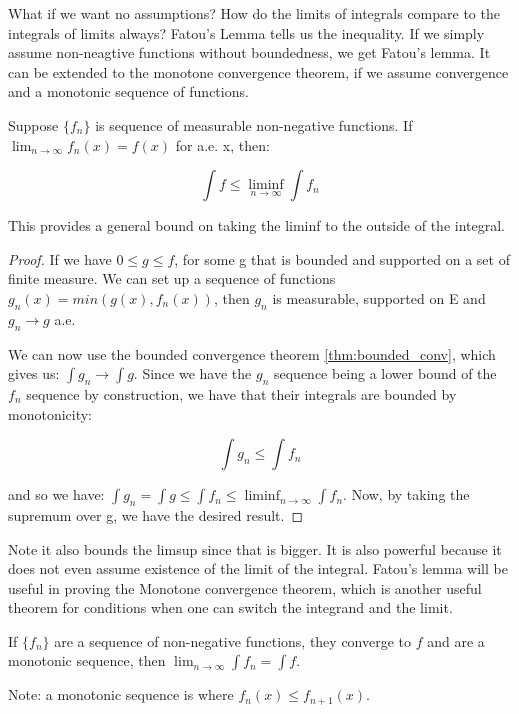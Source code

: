 \documentclass[class=article, crop=false]{standalone}
\begin{document}
		What if we want no assumptions? How do the limits of integrals compare to the integrals of limits always? Fatou's Lemma tells us the inequality. If we simply assume non-neagtive functions without boundedness, we get Fatou's lemma. It can be extended to the monotone convergence theorem, if we assume convergence and a monotonic sequence of functions.

		\begin{theorem} 
		\label{thm:fatous_lemma}
			Suppose $\{f_n\}$ is sequence of measurable non-negative functions. If $\lim_{n\rightarrow\infty} f_n(x) = f(x)$ for a.e. x, then:

				$$\int f \le \liminf_{n\rightarrow\infty} \int f_n$$

			This provides a general bound on taking the liminf to the outside of the integral. 
		\end{theorem}
		\begin{proof}
			If we have $0 \le g \le f$, for some g that is bounded and supported on a set of finite measure. We can set up a sequence of functions $g_n(x) = min(g(x), f_n(x))$, then $g_n$ is measurable, supported on E and $g_n \rightarrow g$ a.e.

			We can now use the bounded convergence theorem \ref{thm:bounded_conv}, which gives us: $\int g_n \rightarrow \int g$. Since we have the $g_n$ sequence being a lower bound of the $f_n$ sequence by construction, we have that their integrals are bounded by monotonicity:

				$$\int g_n \le \int f_n$$

			and so we have: $\int g_n = \int g \le \int f_n \le \liminf_{n\rightarrow\infty} \int f_n$. Now, by taking the supremum over g, we have the desired result.
		\end{proof}

		Note it also bounds the limsup since that is bigger. It is also powerful because it does not even assume existence of the limit of the integral. Fatou's lemma will be useful in proving the Monotone convergence theorem, which is another useful theorem for conditions when one can switch the integrand and the limit.

		\begin{theorem} 
		\label{thm:monotone_conv}
			If $\{f_n\}$ are a sequence of non-negative functions, they converge to $f$ and are a monotonic sequence, then $\lim_{n\rightarrow\infty} \int f_n = \int f$.

			Note: a monotonic sequence is where $f_n(x) \le f_{n+1}(x)$. 
		\end{theorem}	
\end{document}
